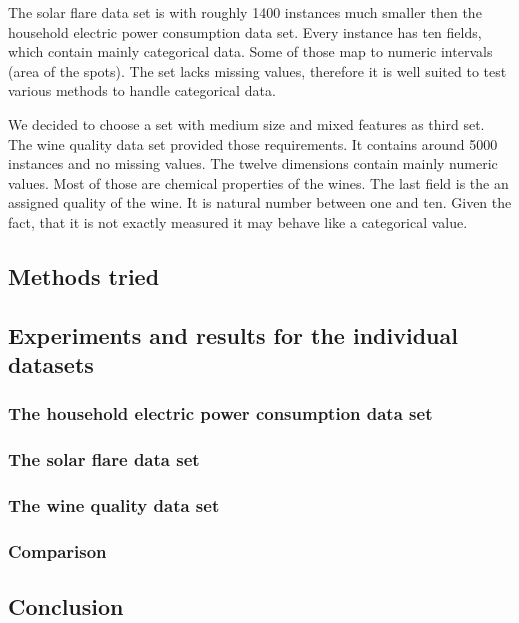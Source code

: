 \documentclass[a4paper]{article}
\begin{document}
The solar flare data set is with roughly 1400 instances much smaller then the
household electric power consumption data set. Every instance has ten fields,
which contain mainly categorical data. Some of those map to numeric intervals
(area of the spots). The set lacks missing values, therefore it is well suited
to test various methods to handle categorical data.

We decided to choose a set with medium size and mixed features as third set. The
wine quality data set provided those requirements. It contains around 5000
instances and no missing values. The twelve dimensions contain mainly numeric
values. Most of those are chemical properties of the wines. The last field is
the an assigned quality of the wine. It is natural number between one and ten.
Given the fact, that it is not exactly measured it may behave like a
categorical value.

\subsection{Methods tried}

\subsection{Experiments and results for the individual datasets}
\subsubsection{The household electric power consumption data set}
\subsubsection{The solar flare data set}
\subsubsection{The wine quality data set}
\subsubsection{Comparison}
\subsection{Conclusion}
\end{document}
